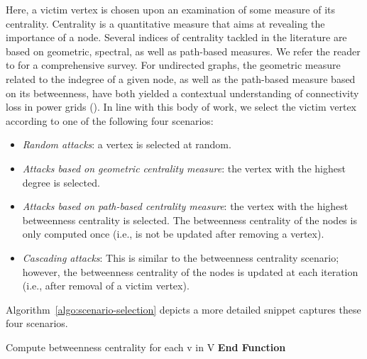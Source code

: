 Here, a victim vertex is chosen upon an examination of some measure of its centrality. Centrality is a quantitative measure that aims at revealing the importance of a node. Several indices of centrality tackled in the literature are based on geometric, spectral, as well as path-based measures. We refer the reader to \cite{BoldiVigna14} for a comprehensive survey. For undirected graphs, the geometric measure related to the indegree of a given node, as well as the path-based measure based on its betweenness, have both yielded a contextual understanding of connectivity loss in power grids (\cite{2000Natur.406..378A, JinAl10}). In line with this body of work, we select the victim vertex according to one of the following four scenarios:
\begin{itemize}
\item \emph{Random attacks}: a vertex is selected at random.
\item \emph{Attacks based on geometric centrality measure}: the vertex with the highest degree is selected. 
\item \emph{Attacks based on path-based centrality measure}: the vertex with the highest betweenness centrality is selected. The betweenness centrality of the nodes is only computed once (i.e., is not be updated after removing a vertex). 
\item \emph{Cascading attacks}: This is similar to the betweenness centrality scenario; however, the betweenness centrality of the nodes is updated at each iteration (i.e., after removal of a victim vertex).
\end{itemize}
Algorithm~\ref{algo:scenario-selection} depicts a more detailed snippet captures these four scenarios.
%

\begin{algorithm}[ht]
Compute betweenness centrality for each v in V\;
\textbf{End Function}
 \caption{}
 \label{algo:scenario-selection}
\end{algorithm}


